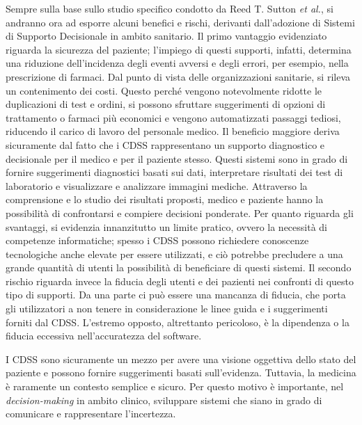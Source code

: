 Sempre sulla base sullo studio specifico condotto da Reed T. Sutton \textit{et al.}\cite{cdss}, si andranno ora ad esporre alcuni benefici e rischi, derivanti dall'adozione di Sistemi di Supporto Decisionale in ambito sanitario.
\newline
Il primo vantaggio evidenziato riguarda la sicurezza del paziente; l’impiego di questi supporti, infatti, determina una riduzione dell'incidenza degli eventi avversi e degli errori, per esempio, nella prescrizione di farmaci.
\newline
Dal punto di vista delle organizzazioni sanitarie, si rileva un contenimento dei costi. Questo perché vengono notevolmente ridotte le duplicazioni di test e ordini, si possono sfruttare suggerimenti di opzioni di trattamento o farmaci più economici e vengono automatizzati passaggi tediosi, riducendo il carico di lavoro del personale medico.
\newline
Il beneficio maggiore deriva sicuramente dal fatto che i CDSS rappresentano un supporto diagnostico e decisionale per il medico e per il paziente stesso. Questi sistemi sono in grado di fornire suggerimenti diagnostici basati sui dati, interpretare risultati dei test di laboratorio e visualizzare e analizzare immagini mediche. Attraverso la comprensione e lo studio dei risultati proposti, medico e paziente hanno la possibilità di confrontarsi e compiere decisioni ponderate.
\newline
Per quanto riguarda gli svantaggi, si evidenzia innanzitutto un limite pratico, ovvero la necessità di competenze informatiche; spesso i CDSS possono richiedere conoscenze tecnologiche anche elevate per essere utilizzati, e ciò potrebbe precludere a una grande quantità di utenti la possibilità di beneficiare di questi sistemi.
\newline
Il secondo rischio riguarda invece la fiducia degli utenti e dei pazienti nei confronti di questo tipo di supporti. Da una parte ci può essere una mancanza di fiducia, che porta gli utilizzatori a non tenere in considerazione le linee guida  e i suggerimenti forniti dal CDSS. L’estremo opposto, altrettanto pericoloso, è la dipendenza o la fiducia eccessiva nell'accuratezza del software.

I CDSS sono sicuramente un mezzo per avere una visione oggettiva dello stato del paziente e possono fornire suggerimenti basati sull'evidenza. Tuttavia, la medicina è raramente un contesto semplice e sicuro. Per questo motivo è importante, nel \textit{decision-making} in ambito clinico, sviluppare sistemi che siano in grado di comunicare e rappresentare l’incertezza.

